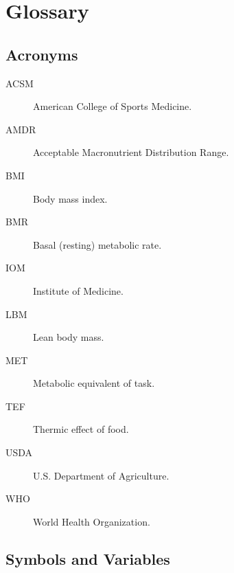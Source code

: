 
\section{Glossary}

\subsection{Acronyms}

\begin{description}
\item[ACSM] American College of Sports Medicine.
\item[AMDR] Acceptable Macronutrient Distribution Range.
\item[BMI] Body mass index.
\item[BMR] Basal (resting) metabolic rate.
\item[IOM] Institute of Medicine.
\item[LBM] Lean body mass.
\item[MET] Metabolic equivalent of task.
\item[TEF] Thermic effect of food.
\item[USDA] U.S. Department of Agriculture.
\item[WHO] World Health Organization.
\end{description}

\subsection{Symbols and Variables}

